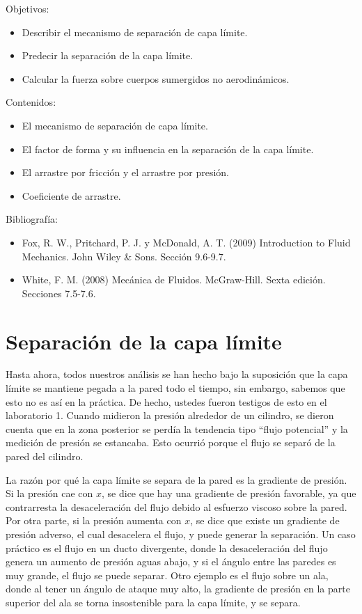 \begin{framed}

Objetivos:
\begin{itemize}
    \item Describir el mecanismo de separación de capa límite.
    \item Predecir la separación de la capa límite.
    \item Calcular la fuerza sobre cuerpos sumergidos no aerodinámicos.
\end{itemize}

Contenidos:
\begin{itemize}
    \item El mecanismo de separación de capa límite.
    \item El factor de forma y su influencia en la separación de la capa límite.
    \item El arrastre por fricción y el arrastre por presión.
    \item Coeficiente de arrastre.
\end{itemize}

Bibliografía:
\begin{itemize}
    \item Fox, R. W., Pritchard, P. J. y McDonald, A. T. (2009) Introduction to Fluid Mechanics. John Wiley \& Sons. Sección 9.6-9.7.
    \item White, F. M. (2008) Mecánica de Fluidos. McGraw-Hill. Sexta edición. Secciones 7.5-7.6.
\end{itemize}
\end{framed}

\section*{Separación de la capa límite}

Hasta ahora, todos nuestros análisis se han hecho bajo la suposición que la capa límite se mantiene pegada a la pared todo el tiempo, sin embargo, sabemos que esto no es así en la práctica. 
De hecho, ustedes fueron testigos de esto en el laboratorio 1.
Cuando midieron la presión alrededor de un cilindro, se dieron cuenta que en la zona posterior se perdía la tendencia tipo ``flujo potencial'' y la medición de presión se estancaba.
Esto ocurrió porque el flujo se separó de la pared del cilindro.

La razón por qué la capa límite se separa de la pared es la gradiente de presión.
Si la presión cae con $x$, se dice que hay una gradiente de presión favorable, ya que contrarresta la desaceleración del flujo debido al esfuerzo viscoso sobre la pared.
Por otra parte, si la presión aumenta con $x$, se dice que existe un gradiente de presión adverso, el cual desacelera el flujo, y puede generar la separación.
Un caso práctico es el flujo en un ducto divergente, donde la desaceleración del flujo genera un aumento de presión aguas abajo, y si el ángulo entre las paredes es muy grande, el flujo se puede separar.
Otro ejemplo es el flujo sobre un ala, donde al tener un ángulo de ataque muy alto, la gradiente de presión en la parte superior del ala se torna insostenible para la capa límite, y se separa.

